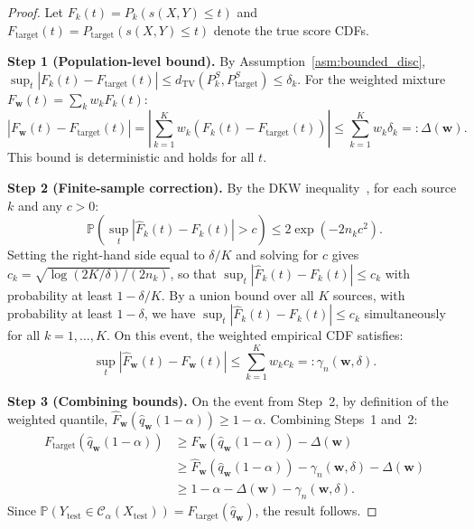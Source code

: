 \documentclass{article}
\newcommand{\Prob}{\mathbb{P}}
\newcommand{\calC}{\mathcal{C}}
\newcommand{\dTV}{d_{\mathrm{TV}}}
\newcommand{\Fhat}{\widehat{F}}
\newcommand{\qhat}{\widehat{q}}
\begin{document}
\begin{proof}
Let $F_k(t) = P_k(s(X,Y) \leq t)$ and $F_{\text{target}}(t) = P_{\text{target}}(s(X,Y) \leq t)$ denote the true score CDFs.

\textbf{Step 1 (Population-level bound).} By Assumption~\ref{asm:bounded_disc}, $\sup_t|F_k(t) - F_{\text{target}}(t)| \leq \dTV(P_k^S, P_{\text{target}}^S) \leq \delta_k$. For the weighted mixture $F_{\mathbf{w}}(t) = \sum_k w_k F_k(t)$:
\begin{equation}
\left|F_{\mathbf{w}}(t) - F_{\text{target}}(t)\right| = \left|\sum_{k=1}^K w_k \left(F_k(t) - F_{\text{target}}(t)\right)\right| \leq \sum_{k=1}^K w_k \delta_k =: \Delta(\mathbf{w}).
\end{equation}
This bound is deterministic and holds for all $t$.

\textbf{Step 2 (Finite-sample correction).} By the DKW inequality~\citep{massart1990tight}, for each source $k$ and any $c > 0$:
\begin{equation}
\Prob\!\left(\sup_t |\Fhat_k(t) - F_k(t)| > c\right) \leq 2\exp(-2n_k c^2).
\end{equation}
Setting the right-hand side equal to $\delta/K$ and solving for $c$ gives $c_k = \sqrt{\log(2K/\delta)/(2n_k)}$, so that $\sup_t |\Fhat_k(t) - F_k(t)| \leq c_k$ with probability at least $1 - \delta/K$. By a union bound over all $K$ sources, with probability at least $1 - \delta$, we have $\sup_t |\Fhat_k(t) - F_k(t)| \leq c_k$ simultaneously for all $k = 1, \ldots, K$. On this event, the weighted empirical CDF satisfies:
\begin{equation}
\sup_t\left|\Fhat_{\mathbf{w}}(t) - F_{\mathbf{w}}(t)\right| \leq \sum_{k=1}^K w_k c_k =: \gamma_n(\mathbf{w}, \delta).
\end{equation}

\textbf{Step 3 (Combining bounds).} On the event from Step~2, by definition of the weighted quantile, $\Fhat_{\mathbf{w}}(\qhat_{\mathbf{w}}(1-\alpha)) \geq 1 - \alpha$. Combining Steps~1 and~2:
\begin{align}
F_{\text{target}}(\qhat_{\mathbf{w}}(1-\alpha)) &\geq F_{\mathbf{w}}(\qhat_{\mathbf{w}}(1-\alpha)) - \Delta(\mathbf{w}) \\
&\geq \Fhat_{\mathbf{w}}(\qhat_{\mathbf{w}}(1-\alpha)) - \gamma_n(\mathbf{w}, \delta) - \Delta(\mathbf{w}) \\
&\geq 1 - \alpha - \Delta(\mathbf{w}) - \gamma_n(\mathbf{w}, \delta).
\end{align}
Since $\Prob(Y_{\text{test}} \in \calC_\alpha(X_{\text{test}})) = F_{\text{target}}(\qhat_{\mathbf{w}})$, the result follows.
\end{proof}
\end{document}
